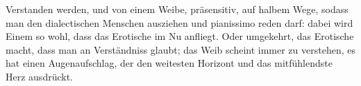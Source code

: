 Verstanden werden, und von einem Weibe, präsensitiv, auf halbem Wege, sodass man den dialectischen Menschen ausziehen und pianissimo reden darf: dabei wird Einem so wohl, dass das Erotische im Nu anfliegt. Oder umgekehrt, das Erotische macht, dass man an Verständniss glaubt; das Weib scheint immer zu verstehen, es hat einen Augenaufschlag, der den weitesten Horizont und das mitfühlendste Herz ausdrückt.
\par

